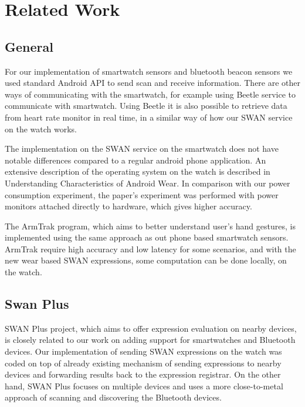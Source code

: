 
\chapter{Related Work} %

\label{Chapter2} %



\section{General}
For our implementation of smartwatch sensors and bluetooth beacon sensors we used standard Android API to send scan and receive information.
There are other ways of communicating with the smartwatch, for example using Beetle\cite{beetle_mobisys16} service to communicate with smartwatch.
Using Beetle it is also possible to retrieve data from heart rate monitor in real time, in a similar way of how our SWAN service on the watch works.

The implementation on the SWAN service on the smartwatch does not have notable differences compared to a regular android phone application.
An extensive description of the operating system on the watch is described in Understanding Characteristics of Android Wear\cite{android_wear_char}.
In comparison with our power consumption experiment, the paper's experiment was performed  with power monitors attached 
directly to hardware, which gives higher accuracy.

The ArmTrak\cite{arm_trak} program, which aims to better understand user's hand gestures, is implemented using the same approach as out phone based 
smartwatch sensors. ArmTrak require high accuracy and low latency for some scenarios, and with the new wear based SWAN expressions, some computation can be
done locally, on the watch.

\section{Swan Plus}
SWAN Plus\cite{swan_plus} project, which aims to offer expression evaluation on nearby devices, is closely related to our work on adding support for smartwatches and Bluetooth devices.
Our implementation of sending SWAN expressions on the watch was coded on top of already existing mechanism of sending expressions to nearby devices and forwarding results back to the expression
registrar. On the other hand, SWAN Plus focuses on multiple devices and uses a more close-to-metal approach of scanning and discovering the Bluetooth devices.

